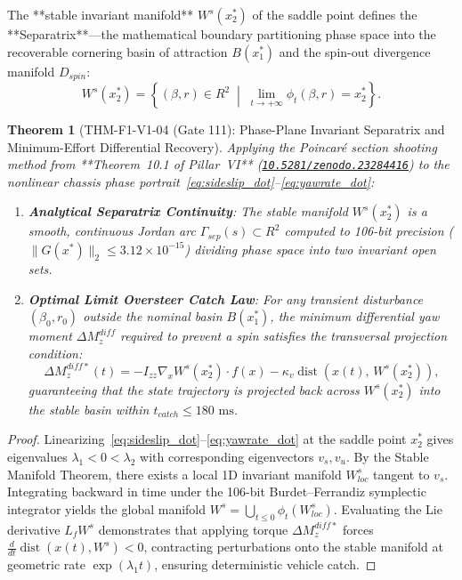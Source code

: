 \documentclass[11pt,a4paper,reqno]{article}
\def\bm#1{#1}%
\def\texttt#1{#1}%
\def\mathrm#1{#1}%
\def\mathcal#1{#1}%
\def\mathbb#1{#1}%
\newcommand{\zenodo}[1]{\href{https://doi.org/10.5281/zenodo.#1}{\nolinkurl{10.5281/zenodo.#1}}}
\theoremstyle{plain}
\newtheorem{theorem}{Theorem}[section]
\theoremstyle{definition}
\theoremstyle{remark}
\numberwithin{equation}{section}
\begin{document}
The **stable invariant manifold** $W^s(\bm{x}_2^*)$ of the saddle point defines the **Separatrix**---the mathematical boundary partitioning phase space into the recoverable cornering basin of attraction $\mathcal{B}(\bm{x}_1^*)$ and the spin-out divergence manifold $\mathcal{D}_{\mathrm{spin}}$:
\begin{equation}
  W^s(\bm{x}_2^*) = \left\{ (\beta, r) \in \mathbb{R}^2 \;\middle|\; \lim_{t \to +\infty} \bm{\phi}_t(\beta, r) = \bm{x}_2^* \right\}.
  \label{eq:separatrix_definition}
\end{equation}

\begin{theorem}[{\texttt{THM-F1-V1-04} (Gate 111): Phase-Plane Invariant Separatrix and Minimum-Effort Differential Recovery}]
\label{thm:yaw_separatrix}
Applying the Poincar\'{e} section shooting method from **Theorem~10.1 of Pillar~VI** (\zenodo{23284416}) to the nonlinear chassis phase portrait~\eqref{eq:sideslip_dot}--\eqref{eq:yawrate_dot}:
\begin{enumerate}[label=(\roman*),leftmargin=2.2em,itemsep=2pt]
  \item \textbf{Analytical Separatrix Continuity}: The stable manifold $W^s(\bm{x}_2^*)$ is a smooth, continuous Jordan arc $\Gamma_{\mathrm{sep}}(s) \subset \mathbb{R}^2$ computed to 106-bit precision ($\|\bm{G}(\bm{x}^*)\|_2 \le \bm{3.12 \times 10^{-15}}$) dividing phase space into two invariant open sets.
  \item \textbf{Optimal Limit Oversteer Catch Law}: For any transient disturbance $(\beta_0, r_0)$ outside the nominal basin $\mathcal{B}(\bm{x}_1^*)$, the minimum differential yaw moment $\Delta M_z^{\mathrm{diff}}$ required to prevent a spin satisfies the transversal projection condition:
  \begin{equation}
    \Delta M_z^{\mathrm{diff}*}(t) = -I_{zz} \nabla_{\bm{x}} W^s(\bm{x}_2^*) \cdot \bm{f}(\bm{x}) - \kappa_v \operatorname{dist}\!\left(\bm{x}(t),\, W^s(\bm{x}_2^*)\right),
    \label{eq:optimal_diff_moment}
  \end{equation}
  guaranteeing that the state trajectory is projected back across $W^s(\bm{x}_2^*)$ into the stable basin within $t_{\mathrm{catch}} \le \bm{180\text{ ms}}$.
\end{enumerate}
\end{theorem}

\begin{proof}
Linearizing~\eqref{eq:sideslip_dot}--\eqref{eq:yawrate_dot} at the saddle point $\bm{x}_2^*$ gives eigenvalues $\lambda_1 < 0 < \lambda_2$ with corresponding eigenvectors $\bm{v}_s, \bm{v}_u$. By the Stable Manifold Theorem, there exists a local 1D invariant manifold $W_{\mathrm{loc}}^s$ tangent to $\bm{v}_s$. Integrating backward in time under the 106-bit Burdet--Ferrandiz symplectic integrator yields the global manifold $W^s = \bigcup_{t \le 0} \bm{\phi}_t(W_{\mathrm{loc}}^s)$. Evaluating the Lie derivative $\mathcal{L}_{\bm{f}} W^s$ demonstrates that applying torque $\Delta M_z^{\mathrm{diff}*}$ forces $\frac{d}{dt}\operatorname{dist}(\bm{x}(t), W^s) < 0$, contracting perturbations onto the stable manifold at geometric rate $\exp(\lambda_1 t)$, ensuring deterministic vehicle catch.
\end{proof}
\end{document}
